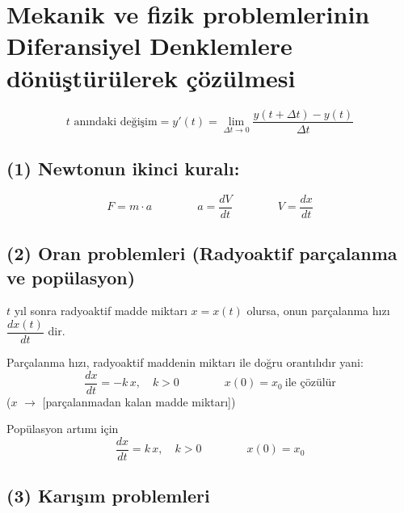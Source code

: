 \documentclass[11pt,a4paper]{article}
\begin{document}

\section{Mekanik ve fizik problemlerinin Diferansiyel Denklemlere dönüştürülerek çözülmesi}

\[
  \text{$t$ anındaki değişim} = y'(t) = \lim_{\Delta t\to 0}\frac{y(t+\Delta t)-y(t)}{\Delta t}
\]

\subsection{(1) Newtonun ikinci kuralı:}
\[
  F = m\cdot a \qquad\qquad a = \frac{dV}{dt} \qquad\qquad V = \frac{dx}{dt}
\]

\subsection{(2) Oran problemleri (Radyoaktif parçalanma ve popülasyon)}
$t$ yıl sonra radyoaktif madde miktarı $x = x(t)$ olursa, onun parçalanma hızı $\dfrac{dx(t)}{dt}$ dir.

Parçalanma hızı, radyoaktif maddenin miktarı ile doğru orantılıdır yani:
\[
  \frac{dx}{dt} = -k\,x,\quad k>0 \qquad\qquad x(0)=x_0 \ \text{ile çözülür}
\]
{\small ($x$ $\rightarrow$ [parçalanmadan kalan madde miktarı])}

Popülasyon artımı için
\[
  \frac{dx}{dt} = k\,x,\quad k>0 \qquad\qquad x(0)=x_0
\]

\subsection{(3) Karışım problemleri}

\begin{center}
\end{center}
\end{document}
